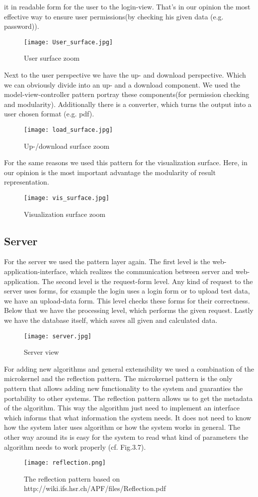 \documentclass{book}
\begin{document}
it in readable form for the user to the login-view. That's in our opinion the most effective way to ensure user permissions(by checking his given data (e.g. password)).
\begin{figure}[h]
\centering
\texttt{[image: User\_surface.jpg]}
\caption{User surface zoom}
\label{Fig. 4}
\end{figure}
Next to the user perspective we have the up- and download perspective. Which we can obviously divide into an up- and a download component. We used the model-view-controller pattern portray these components(for permission checking and modularity). Additionally there is a converter, which turns the output into a user chosen format (e.g. pdf).
\begin{figure}[h]
\centering
\texttt{[image: load\_surface.jpg]}
\caption{Up-/download surface zoom}
\label{Fig. 5}
\end{figure}
For the same reasons we used this pattern for the visualization surface. Here, in our opinion is the most important advantage the modularity of result representation.
\begin{figure}[h]
\centering
\texttt{[image: vis\_surface.jpg]}
\caption{Visualization surface zoom}
\label{Fig. 6}
\end{figure}
\subsection{Server}
For the server we used the pattern layer again. The first level is the web-application-interface, which realizes the communication between server and web-application. The second level is the request-form level. Any kind of request to the server uses forms, for example the login uses a login form or to upload test data, we have an upload-data form. This level checks these forms for their correctness. Below that we have the processing level, which performs the given request. Lastly we have the database itself, which saves all given and calculated data.
\begin{figure}[h]
\centering
\texttt{[image: server.jpg]}
\caption{Server view}
\label{Fig. 7}
\end{figure}
For adding new algorithms and general extensibility we used a combination of the microkernel and the reflection pattern. The microkernel pattern is the only pattern that allows adding new functionality to the system and guaranties the portability to other systems. The reflection pattern allows us to get the metadata of the algorithm.
This way the algorithm just need to implement an interface which informs that what information the system needs. It does not need to know how the system later uses algorithm or how the system works in general. The other way around its is easy for the system to read what kind of parameters the algorithm needs to work properly (cf. Fig.3.7).
\begin{figure}[h]
\centering
\texttt{[image: reflection.png]}
\caption{The reflection pattern based on http://wiki.ifs.hsr.ch/APF/files/Reflection.pdf}
\label{Fig. 8}
\end{figure}
\end{document}
